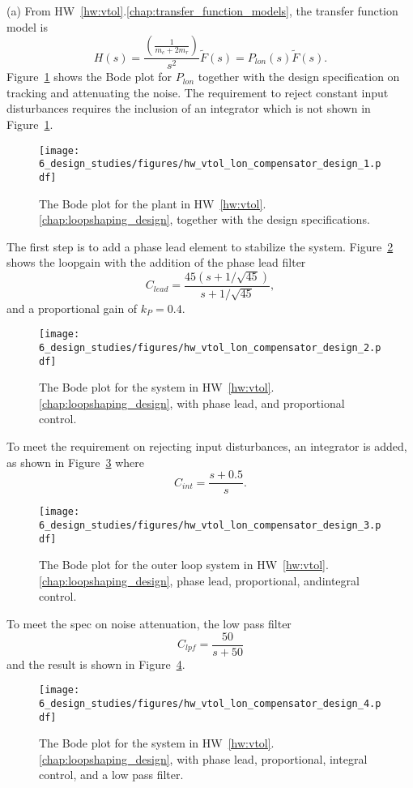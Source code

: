 (a) From HW~\ref{hw:vtol}.\ref{chap:transfer_function_models}, the transfer function model is
\[
H(s) = \frac{\left(\frac{1}{m_c + 2 m_r}\right)}{s^2}\tilde{F}(s) = P_{lon}(s)\tilde{F}(s).
\]
Figure~\ref{fig:hw_vtol_lon_compensator_design_1} shows the Bode plot for $P_{lon}$ together with the design specification on tracking and attenuating the noise.  The requirement to reject constant input disturbances requires the inclusion of an integrator which is not shown in Figure~\ref{fig:hw_vtol_lon_compensator_design_1}.
%
\begin{figure}[H]
   \centering
   \texttt{[image: 6\_design\_studies/figures/hw\_vtol\_lon\_compensator\_design\_1.pdf]}
   \caption{The Bode plot for the plant in HW~\ref{hw:vtol}.\ref{chap:loopshaping_design}, together with the design specifications.}
   \label{fig:hw_vtol_lon_compensator_design_1}
\end{figure}

The first step is to add a phase lead element to stabilize the system.  Figure~\ref{fig:hw_vtol_lon_compensator_design_2} shows the loopgain with the addition of the phase lead filter
\[
C_{lead} = \frac{45(s+1/\sqrt{45})}{s+1/\sqrt{45}},
\]
and a proportional gain of $k_P=0.4$.
\begin{figure}[H]
   \centering
   \texttt{[image: 6\_design\_studies/figures/hw\_vtol\_lon\_compensator\_design\_2.pdf]}
   \caption{The Bode plot for the system in HW~\ref{hw:vtol}.\ref{chap:loopshaping_design}, with phase lead, and proportional control.}
   \label{fig:hw_vtol_lon_compensator_design_2}
\end{figure}
To meet the requirement on rejecting input disturbances, an integrator is added, as shown in Figure~\ref{fig:hw_vtol_lon_compensator_design_3} where
\[
C_{int} = \frac{s+0.5}{s}.
\]
\begin{figure}[H]
   \centering
   \texttt{[image: 6\_design\_studies/figures/hw\_vtol\_lon\_compensator\_design\_3.pdf]}
   \caption{The Bode plot for the outer loop system in HW~\ref{hw:vtol}.\ref{chap:loopshaping_design}, phase lead, proportional, andintegral control.}
   \label{fig:hw_vtol_lon_compensator_design_3}
\end{figure}
To meet the spec on noise attenuation, the low pass filter
\[
C_{lpf} = \frac{50}{s+50}
\]
and the result is shown in Figure~\ref{fig:hw_vtol_lon_compensator_design_4}.
\begin{figure}[H]
   \centering
   \texttt{[image: 6\_design\_studies/figures/hw\_vtol\_lon\_compensator\_design\_4.pdf]}
   \caption{The Bode plot for the system in HW~\ref{hw:vtol}.\ref{chap:loopshaping_design}, with phase lead, proportional, integral control, and a low pass  filter.}
   \label{fig:hw_vtol_lon_compensator_design_4}
\end{figure}


